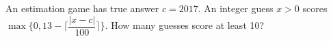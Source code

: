 An estimation game has true answer $c=2017$. An integer guess $x>0$ scores $\max\{0,13-\lceil\dfrac{|x-c|}{100}\rceil\}$. How many guesses score at least 10?

